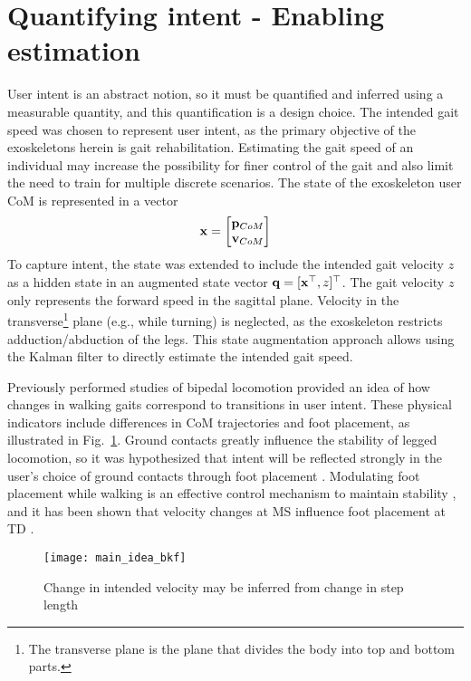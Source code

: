 \section{Quantifying intent - Enabling estimation}\label{sec:quantification}
User intent is an abstract notion, so it must be quantified and inferred using a measurable quantity, and this quantification is a design choice. The intended gait speed was chosen to represent user intent, as the primary objective of the exoskeletons herein is gait rehabilitation. Estimating the gait speed of an individual may increase the possibility for finer control of the gait and also limit the need to train for multiple discrete scenarios. The state of the exoskeleton user CoM is represented in a vector 
\[
	\mathbf{x} = \begin{bmatrix}
		\mathbf{p}_{CoM} \\
		\mathbf{v}_{CoM}
	\end{bmatrix}
\] 
To capture intent, the state was extended to include the intended gait velocity $ z $ as a hidden state in an augmented state vector $ \mathbf{q} = [\mathbf{x}^{\top} ,z]^{\top} $. The gait velocity $ z $ only represents the forward speed in the sagittal plane. Velocity in the transverse\footnote{The transverse plane is the plane that divides the body into top and bottom parts. } plane (e.g., while turning) is neglected, as the exoskeleton restricts adduction/abduction of the legs. This state augmentation approach allows using the Kalman filter to directly estimate the intended gait speed. 

Previously performed studies of bipedal locomotion provided an idea of how changes in walking gaits correspond to transitions in user intent. These physical indicators include differences in CoM trajectories and foot placement, as illustrated in Fig.~\ref{fig:main_idea}. Ground contacts greatly influence the stability of legged locomotion, so it was hypothesized that intent will be reflected strongly in the user's choice of ground contacts through foot placement \cite{bhounsule2014foot}. Modulating foot placement while walking is an effective control mechanism to maintain stability \cite{hof2010balance,bhounsule2015control}, and it has been shown that velocity changes at MS influence foot placement at TD \cite{wang2014stepping,redfern1994model}. 
%
\begin{figure}
	\centering
	\texttt{[image: main\_idea\_bkf]}
	\caption{Change in intended velocity may be inferred from change in step length}\label{fig:main_idea}
\end{figure}

